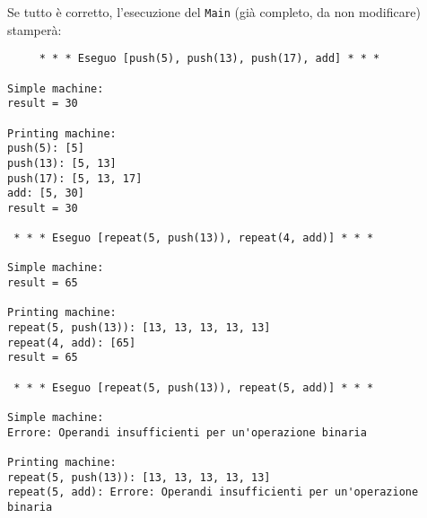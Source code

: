 \documentclass[12pt]{article}
\begin{document}
Se tutto \`e corretto, l'esecuzione del \texttt{Main} (gi\`a completo, da non
modificare) stamper\`a:

\begin{mdframed}[backgroundcolor=lightred]
  {\small\begin{verbatim}
     * * * Eseguo [push(5), push(13), push(17), add] * * *

Simple machine:
result = 30

Printing machine:
push(5): [5]
push(13): [5, 13]
push(17): [5, 13, 17]
add: [5, 30]
result = 30

 * * * Eseguo [repeat(5, push(13)), repeat(4, add)] * * *

Simple machine:
result = 65

Printing machine:
repeat(5, push(13)): [13, 13, 13, 13, 13]
repeat(4, add): [65]
result = 65

 * * * Eseguo [repeat(5, push(13)), repeat(5, add)] * * *

Simple machine:
Errore: Operandi insufficienti per un'operazione binaria

Printing machine:
repeat(5, push(13)): [13, 13, 13, 13, 13]
repeat(5, add): Errore: Operandi insufficienti per un'operazione binaria
\end{verbatim}}
\end{mdframed}
\end{document}
